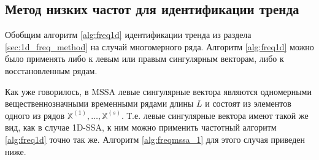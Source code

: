 \documentclass[specialist,
               substylefile = spbu.rtx,
               subf,href,colorlinks=true, 12pt]{disser}
\begin{document}
%
%

\subsection{Метод низких частот для идентификации тренда}
\label{sec:freq_method_mssa}
Обобщим алгоритм \ref{alg:freq1d} идентификации тренда из раздела \ref{sec:1d_freq_method} на случай многомерного ряда. Алгоритм \ref{alg:freq1d} можно было применять либо к левым или правым сингулярным векторам, либо к восстановленным рядам. 

Как уже говорилось, в MSSA левые сингулярные вектора являются одномерными вещественнозначными временными рядами длины $L$ и состоят из элементов одного из рядов $\mathbb{X}^{(1)}, \ldots, \mathbb{X}^{(s)}$. Т.е. левые сингулярные вектора имеют такой же вид, как в случае 1D-SSA, к ним можно применить частотный алгоритм \ref{alg:freq1d} точно так же. Алгоритм \ref{alg:freqmssa_1} для этого случая приведен ниже.

\end{document}
